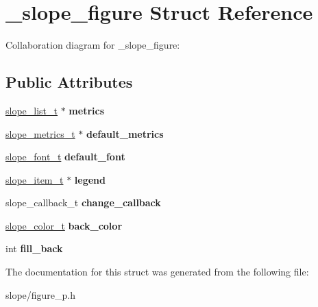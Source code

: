 \hypertarget{struct__slope__figure}{\section{\+\_\+slope\+\_\+figure Struct Reference}
\label{struct__slope__figure}
}


Collaboration diagram for \+\_\+slope\+\_\+figure\+:
\subsection*{Public Attributes}
\begin{DoxyCompactItemize}
\item 
\hypertarget{struct__slope__figure_a783cd1c9b86d7ddc6997a4b7e51b80df}{\hyperlink{group__List_ga88326d377deca937191acac6784bff0e}{slope\+\_\+list\+\_\+t} $\ast$ {\bfseries metrics}}\label{struct__slope__figure_a783cd1c9b86d7ddc6997a4b7e51b80df}

\item 
\hypertarget{struct__slope__figure_a76f248fab4d59b4170709525bca5883c}{\hyperlink{group__Metrics_gab80787ee8ae8dc449e770249fe0e3c35}{slope\+\_\+metrics\+\_\+t} $\ast$ {\bfseries default\+\_\+metrics}}\label{struct__slope__figure_a76f248fab4d59b4170709525bca5883c}

\item 
\hypertarget{struct__slope__figure_a1187fb125d8a66224dce9181887ed3c6}{\hyperlink{group__Primitives_ga29945f78eef5fcab497a3d15908b4b73}{slope\+\_\+font\+\_\+t} {\bfseries default\+\_\+font}}\label{struct__slope__figure_a1187fb125d8a66224dce9181887ed3c6}

\item 
\hypertarget{struct__slope__figure_ad5e0bd96cade55ef42f5a954322b0ac1}{\hyperlink{group__Item_ga2616141f0e164a876049da51ea3a8646}{slope\+\_\+item\+\_\+t} $\ast$ {\bfseries legend}}\label{struct__slope__figure_ad5e0bd96cade55ef42f5a954322b0ac1}

\item 
\hypertarget{struct__slope__figure_ab4d6de431e6f0b4a97b780b606ae0da3}{slope\+\_\+callback\+\_\+t {\bfseries change\+\_\+callback}}\label{struct__slope__figure_ab4d6de431e6f0b4a97b780b606ae0da3}

\item 
\hypertarget{struct__slope__figure_afce997af5c45b99ba7f123d40b5d0975}{\hyperlink{struct__slope__color}{slope\+\_\+color\+\_\+t} {\bfseries back\+\_\+color}}\label{struct__slope__figure_afce997af5c45b99ba7f123d40b5d0975}

\item 
\hypertarget{struct__slope__figure_ac29b1eb35fd245cf8603548bf360f415}{int {\bfseries fill\+\_\+back}}\label{struct__slope__figure_ac29b1eb35fd245cf8603548bf360f415}

\end{DoxyCompactItemize}


The documentation for this struct was generated from the following file\+:\begin{DoxyCompactItemize}
\item 
slope/figure\+\_\+p.\+h\end{DoxyCompactItemize}
